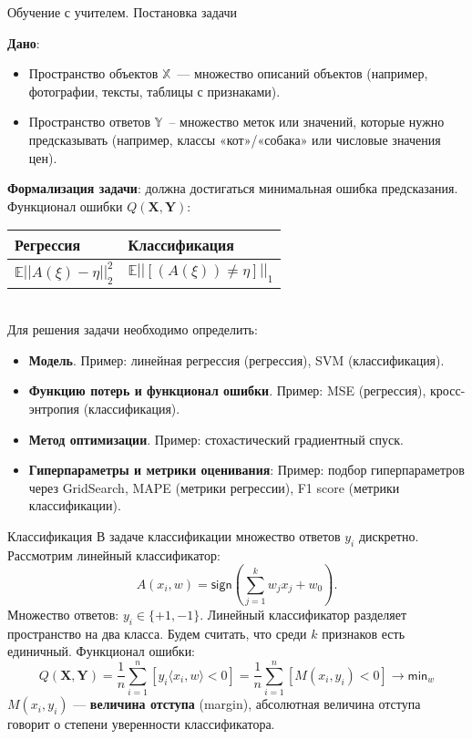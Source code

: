 \documentclass[handout]{beamer}
\begin{document}
\begin{frame}{Обучение с учителем. Постановка задачи}
	
	{\bf Дано}: 
	\begin{itemize}
		\item Пространство объектов $\mathbb{X}$~--- множество описаний объектов (например, фотографии, тексты, таблицы с признаками).
		\item Пространство ответов $\mathbb{Y}$~-- множество меток или значений, которые нужно предсказывать (например, классы «кот»/«собака» или числовые значения цен).
	\end{itemize}	
	
	





	\textbf{Формализация задачи}: должна достигаться минимальная ошибка предсказания. \\
	Функционал ошибки $Q(\mathbf{X}, \mathbf{Y})$:\\
	\begin{tabular}{|l|l|}
	  \hline
	  Регрессия & Классификация \\
	  \hline
		 $\mathbb{E}||A(\xi)-\eta||^2_2$ & $\mathbb{E}||[(A(\xi)) \neq \eta]||_1$ \\
	   \hline
	\end{tabular}\\
	Для решения задачи необходимо определить:
	\begin{itemize}
		\item \textbf{Модель}. Пример: линейная регрессия (регрессия), SVM (классификация).
		\item \textbf{Функцию потерь и функционал ошибки}. Пример: MSE (регрессия), кросс-энтропия (классификация). 
		\item \textbf{Метод оптимизации}. Пример: стохастический градиентный спуск.
		\item \textbf{Гиперпараметры и метрики оценивания}: Пример: подбор гиперпараметров через GridSearch, MAPE (метрики регрессии), F1 score (метрики классификации).  
	\end{itemize}
\end{frame}

\begin{frame}{Классификация}
	В задаче классификации множество ответов $y_i$ дискретно.\\
	Рассмотрим линейный классификатор: 
	\begin{equation}
		A(x_i,w)=\mathsf{sign}(\sum_{j=1}^kw_jx_j + w_0).
	\end{equation}
	Множество ответов: $y_i \in \{+1, -1\}$. Линейный классификатор разделяет пространство на два класса. Будем считать, что среди $k$ признаков есть единичный.
	Функционал ошибки:
	\begin{equation}
		Q(\mathbf{X}, \mathbf{Y}) = \frac{1}{n}\sum_{i=1}^{n}[y_i\langle x_i, w\rangle < 0]=\frac{1}{n}\sum_{i=1}^{n}[M(x_i, y_i) < 0] \rightarrow \mathsf{min}_{w}
	\end{equation}
	$M(x_i, y_i)$ --- \textbf{величина отступа} (margin), абсолютная величина отступа говорит о степени уверенности классификатора. 
\end{frame}
\end{document}
